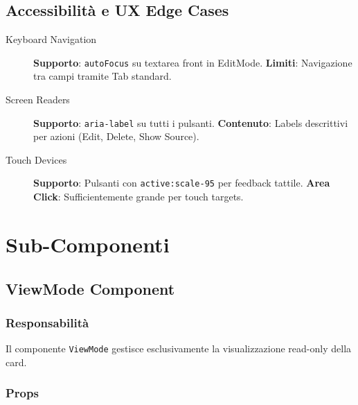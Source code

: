 \documentclass[11pt,a4paper]{article}
\begin{document}
\subsection{Accessibilità e UX Edge Cases}

\begin{description}
    \item[Keyboard Navigation] \textbf{Supporto}: \texttt{autoFocus} su textarea front in EditMode. \textbf{Limiti}: Navigazione tra campi tramite Tab standard.
    
    \item[Screen Readers] \textbf{Supporto}: \texttt{aria-label} su tutti i pulsanti. \textbf{Contenuto}: Labels descrittivi per azioni (Edit, Delete, Show Source).
    
    \item[Touch Devices] \textbf{Supporto}: Pulsanti con \texttt{active:scale-95} per feedback tattile. \textbf{Area Click}: Sufficientemente grande per touch targets.
\end{description}


\section{Sub-Componenti}

\subsection{ViewMode Component}

\subsubsection{Responsabilità}

Il componente \texttt{ViewMode} gestisce esclusivamente la visualizzazione read-only della card.

\subsubsection{Props}
\end{document}
